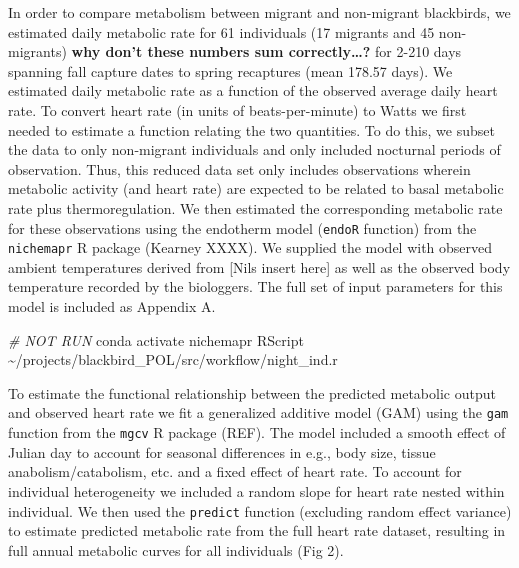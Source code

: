 \documentclass[
]{article}
\newenvironment{Shaded}{\begin{snugshade}}{\end{snugshade}}
\newcommand{\CommentTok}[1]{\textcolor[rgb]{0.56,0.35,0.01}{\textit{#1}}}
\newcommand{\ExtensionTok}[1]{#1}
\newcommand{\NormalTok}[1]{#1}
\begin{document}
In order to compare metabolism between migrant and non-migrant
blackbirds, we estimated daily metabolic rate for 61 individuals (17
migrants and 45 non-migrants) \textbf{why don't these numbers sum
correctly\ldots?} for 2-210 days spanning fall capture dates to spring
recaptures (mean 178.57 days). We estimated daily metabolic rate as a
function of the observed average daily heart rate. To convert heart rate
(in units of beats-per-minute) to Watts we first needed to estimate a
function relating the two quantities. To do this, we subset the data to
only non-migrant individuals and only included nocturnal periods of
observation. Thus, this reduced data set only includes observations
wherein metabolic activity (and heart rate) are expected to be related
to basal metabolic rate plus thermoregulation. We then estimated the
corresponding metabolic rate for these observations using the endotherm
model (\texttt{endoR} function) from the \texttt{nichemapr} R package
(Kearney XXXX). We supplied the model with observed ambient temperatures
derived from {[}Nils insert here{]} as well as the observed body
temperature recorded by the biologgers. The full set of input parameters
for this model is included as Appendix A.

\begin{Shaded}
\begin{Highlighting}[]
\CommentTok{\# NOT RUN}
\ExtensionTok{conda}\NormalTok{ activate nichemapr}
\ExtensionTok{RScript}\NormalTok{ \textasciitilde{}/projects/blackbird\_POL/src/workflow/night\_ind.r}
\end{Highlighting}
\end{Shaded}

To estimate the functional relationship between the predicted metabolic
output and observed heart rate we fit a generalized additive model (GAM)
using the \texttt{gam} function from the \texttt{mgcv} R package (REF).
The model included a smooth effect of Julian day to account for seasonal
differences in e.g., body size, tissue anabolism/catabolism, etc. and a
fixed effect of heart rate. To account for individual heterogeneity we
included a random slope for heart rate nested within individual. We then
used the \texttt{predict} function (excluding random effect variance) to
estimate predicted metabolic rate from the full heart rate dataset,
resulting in full annual metabolic curves for all individuals (Fig 2).
\end{document}
